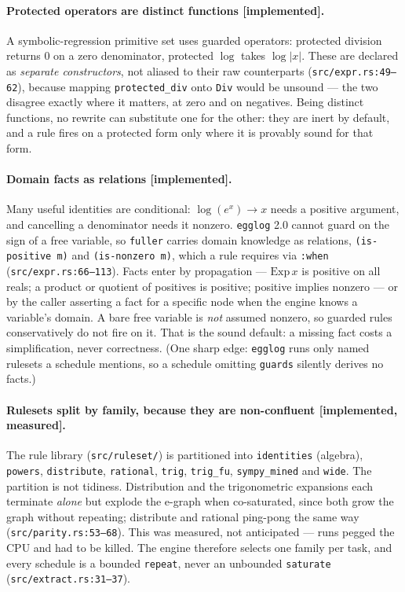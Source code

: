 \documentclass[sigconf]{acmart}
\begin{document}
\paragraph{Protected operators are distinct functions [implemented].} A
symbolic-regression primitive set uses guarded operators: protected division
returns $0$ on a zero denominator, protected $\log$ takes $\log|x|$. These are
declared as \emph{separate constructors}, not aliased to their raw counterparts
(\texttt{src/expr.rs:49--62}), because mapping \texttt{protected\_div} onto
\texttt{Div} would be unsound --- the two disagree exactly where it matters, at
zero and on negatives. Being distinct functions, no rewrite can substitute one
for the other: they are inert by default, and a rule fires on a protected form
only where it is provably sound for that form.

\paragraph{Domain facts as relations [implemented].} Many useful identities are
conditional: $\log(e^x)\to x$ needs a positive argument, and cancelling a
denominator needs it nonzero. \texttt{egglog} 2.0 cannot guard on the sign of a
free variable, so \texttt{fuller} carries domain knowledge as relations,
\texttt{(is-positive m)} and \texttt{(is-nonzero m)}, which a rule requires via
\texttt{:when} (\texttt{src/expr.rs:66--113}). Facts enter by propagation ---
$\mathrm{Exp}\,x$ is positive on all reals; a product or quotient of positives is
positive; positive implies nonzero --- or by the caller asserting a fact for a
specific node when the engine knows a variable's domain. A bare free variable is
\emph{not} assumed nonzero, so guarded rules conservatively do not fire on it.
That is the sound default: a missing fact costs a simplification, never
correctness. (One sharp edge: \texttt{egglog} runs only named rulesets a schedule
mentions, so a schedule omitting \texttt{guards} silently derives no facts.)

\paragraph{Rulesets split by family, because they are non-confluent
[implemented, measured].} The rule library (\texttt{src/ruleset/}) is partitioned
into \texttt{identities} (algebra), \texttt{powers}, \texttt{distribute},
\texttt{rational}, \texttt{trig}, \texttt{trig\_fu}, \texttt{sympy\_mined} and
\texttt{wide}. The partition is not tidiness. Distribution and the trigonometric
expansions each terminate \emph{alone} but explode the e-graph when co-saturated,
since both grow the graph without repeating; distribute and rational ping-pong the
same way (\texttt{src/parity.rs:53--68}). This was measured, not anticipated ---
runs pegged the CPU and had to be killed. The engine therefore selects one family
per task, and every schedule is a bounded \texttt{repeat}, never an unbounded
\texttt{saturate} (\texttt{src/extract.rs:31--37}).
\end{document}
